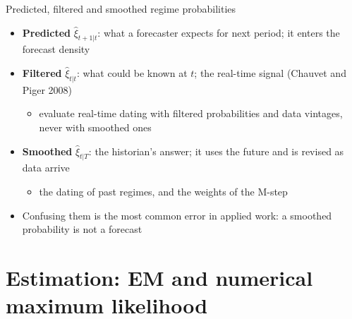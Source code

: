 \begin{frame}{Predicted, filtered and smoothed regime probabilities}
\itemsize{\small}
\begin{itemize}
    \item \textbf{Predicted} $\hat\xi_{t+1|t}$: what a forecaster expects for next period; it enters the forecast density
    \item \textbf{Filtered} $\hat\xi_{t|t}$: what could be known at $t$; the real-time signal (Chauvet and Piger 2008)
    \begin{itemize}
        \item evaluate real-time dating with filtered probabilities and data vintages, never with smoothed ones
    \end{itemize}
    \item \textbf{Smoothed} $\hat\xi_{t|T}$: the historian's answer; it uses the future and is revised as data arrive
    \begin{itemize}
        \item the dating of past regimes, and the weights of the M-step
    \end{itemize}
    \item Confusing them is the most common error in applied work: a smoothed probability is not a forecast
\end{itemize}
\end{frame}


\section{Estimation: EM and numerical maximum likelihood}


